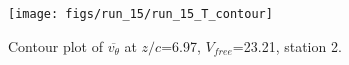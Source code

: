 \begin{figure}[H]
\centering
\texttt{[image: figs/run\_15/run\_15\_T\_contour]}
\caption{Contour plot of $\overline{v_{\theta}}$ at $z/c$=6.97, $V_{free}$=23.21, station 2.}
\label{fig:run_15_T_contour}
\end{figure}



